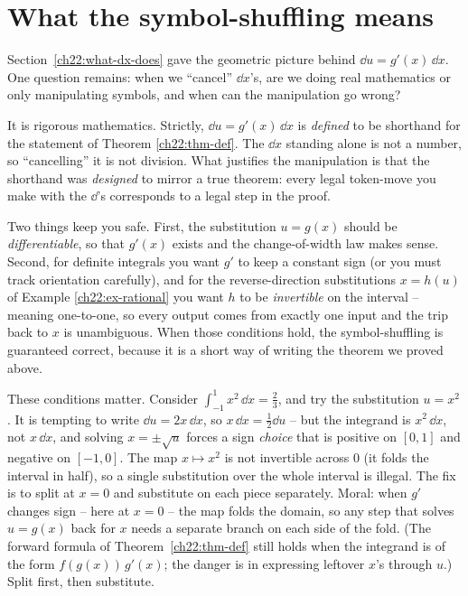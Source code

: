 \section{What the symbol-shuffling means}
\label{ch22:meaning}

Section~\ref{ch22:what-dx-does} gave the geometric picture behind
$\dd u = g'(x)\,\dd x$. One question remains: when we ``cancel'' $\dd x$'s, are we
doing real mathematics or only manipulating symbols, and when can the manipulation
go wrong?

\begin{happeningbox}
It is rigorous mathematics. Strictly, $\dd u = g'(x)\,\dd x$ is \emph{defined} to be shorthand for the
statement of Theorem \ref{ch22:thm-def}. The $\dd x$ standing alone is not a number,
so ``cancelling'' it is not division. What justifies the manipulation is that the
shorthand was \emph{designed} to mirror a true theorem: every legal token-move you
make with the $\dd$'s corresponds to a legal step in the proof.

Two things keep you safe. First, the substitution $u=g(x)$ should be
\emph{differentiable}, so that $g'(x)$ exists and the change-of-width law makes
sense. Second, for definite integrals you want $g'$ to keep a constant sign (or you
must track orientation carefully), and for the reverse-direction substitutions
$x=h(u)$ of Example \ref{ch22:ex-rational} you want $h$ to be \emph{invertible} on
the interval -- meaning one-to-one, so every output comes from exactly one input and
the trip back to $x$ is unambiguous. When those conditions hold, the
symbol-shuffling is guaranteed correct, because it is a short way of writing
the theorem we proved above.
\end{happeningbox}

\begin{trapbox}
These conditions matter. Consider $\int_{-1}^{1} x^2\,\dd x = \tfrac23$,
and try the substitution $u = x^2$. It is tempting to write $\dd u = 2x\,\dd x$, so
$x\,\dd x = \tfrac12\dd u$ -- but the integrand is $x^2\,\dd x$, not $x\,\dd x$, and
solving $x = \pm\sqrt u$ forces a sign \emph{choice} that is positive on $[0,1]$ and
negative on $[-1,0]$. The map $x\mapsto x^2$ is not invertible across $0$ (it folds
the interval in half), so a single substitution over the whole interval is illegal.
The fix is to split at $x=0$ and substitute on each piece separately. Moral:
when $g'$ changes sign -- here at $x=0$ -- the map folds the domain, so any step that
solves $u=g(x)$ back for $x$ needs a separate branch on each side of the fold. (The
forward formula of Theorem~\ref{ch22:thm-def} still holds when the integrand is
of the form $f(g(x))\,g'(x)$; the danger is in expressing leftover $x$'s through $u$.)
Split first, then substitute.
\end{trapbox}

